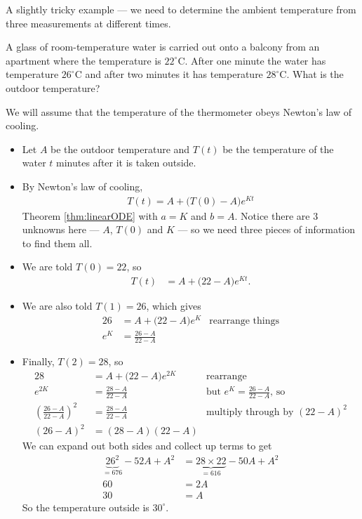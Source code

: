 A slightly tricky example --- we need to determine the ambient temperature from
three
measurements at different times.
\begin{eg}\label{eg:SDEcoolingB}
A glass of room-temperature water is carried out onto a balcony from an
apartment where the temperature is $22^\circ$C. After one minute the water has
temperature $26^\circ$C and after two minutes it has temperature $28^\circ$C.
What is the outdoor temperature?

 \soln We will assume that the temperature of the thermometer obeys Newton's
law
of
 cooling.
 \begin{itemize}
 \item Let $A$ be the outdoor temperature and $T(t)$ be the temperature of the
 water $t$ minutes after it is taken outside.

 \item By Newton's law of cooling,
 \begin{align*}
 T(t)=A+\big(T(0)-A\big)e^{Kt}
 \end{align*}
 Theorem \ref{thm:linearODE} with $a=K$ and $b=A$.
Notice there are 3 unknowns here --- $A$, $T(0)$ and $K$ --- so we
need three pieces of information to find them all.

 \item We are told $T(0)=22$, so
 \begin{align*}
   T(t) &=A+\big(22-A\big)e^{Kt}.
 \end{align*}
 \item We are also told $T(1)=26$, which gives
 \begin{align*}
   26 &=A+\big(22-A\big)e^{K} & \text{rearrange things}\\
   e^K&=\frac{26-A}{22-A}
 \end{align*}
 \item Finally, $T(2)=28$, so
 \begin{align*}
 28&=A+\big(22-A\big)e^{2K} & \text{rearrange}\\
 e^{2K} &= \frac{28-A}{22-A} & \text{but $e^K=\frac{26-A}{22-A}$, so}\\
 \left(\frac{26-A}{22-A}\right)^2 &=\frac{28-A}{22-A}
         & \text{multiply through by  $(22-A)^2$}\\
 (26-A)^2 &= (28-A)(22-A)
 \end{align*}
 We can expand out both sides and collect up terms to get
 \begin{align*}
 \underbrace{26^2}_{=676}-52A+A^2 &= \underbrace{28\times22}_{=616}-50A+A^2 \\
  60 &= 2A \\
   30 &= A
 \end{align*}
 So the temperature outside is $30^\circ$.
 \end{itemize}
\end{eg}


